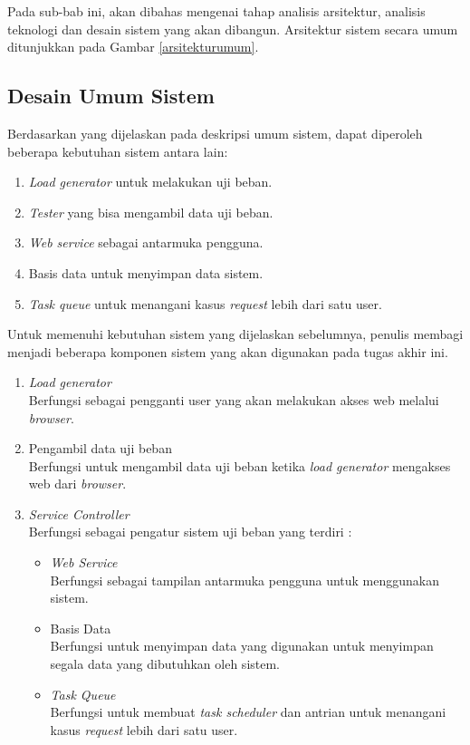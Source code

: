     	\indent Pada sub-bab ini, akan dibahas mengenai tahap analisis arsitektur, analisis teknologi dan desain sistem yang akan dibangun. Arsitektur sistem secara umum ditunjukkan pada Gambar \ref{arsitekturumum}.

    	\subsection{Desain Umum Sistem}
    		Berdasarkan yang dijelaskan pada deskripsi umum sistem, dapat diperoleh beberapa kebutuhan sistem antara lain:
    		\begin{enumerate}
    			\item \textit{Load generator} untuk melakukan uji beban.
    			\item \textit{Tester} yang bisa mengambil data uji beban.
    			\item \textit{Web service} sebagai antarmuka pengguna.
    			\item Basis data untuk menyimpan data sistem.
    			\item \textit{Task queue} untuk menangani kasus \textit{request} lebih dari satu user.
    		\end{enumerate}
    	
    		Untuk memenuhi kebutuhan sistem yang dijelaskan sebelumnya, penulis membagi menjadi beberapa komponen sistem yang akan digunakan pada tugas akhir ini.
    		
    		\begin{enumerate}
    			\item \textit{Load generator} \\
    				Berfungsi sebagai pengganti user yang akan melakukan akses web melalui \textit{browser}.
    			\item Pengambil data uji beban \\
    				Berfungsi untuk mengambil data uji beban ketika \textit{load generator} mengakses web dari \textit{browser}.
    			\item \textit{Service Controller} \\
    				Berfungsi sebagai pengatur sistem uji beban yang terdiri :
    				\begin{itemize}
    					\item \textit{Web Service} \\
    						Berfungsi sebagai tampilan antarmuka pengguna untuk menggunakan sistem.
    					\item Basis Data \\
    						Berfungsi untuk menyimpan data yang digunakan untuk menyimpan segala data yang dibutuhkan oleh sistem.
    					\item \textit{Task Queue} \\
    						Berfungsi untuk membuat \textit{task scheduler} dan antrian untuk menangani kasus \textit{request} lebih dari satu user.
    				\end{itemize}
    		\end{enumerate}
    	
